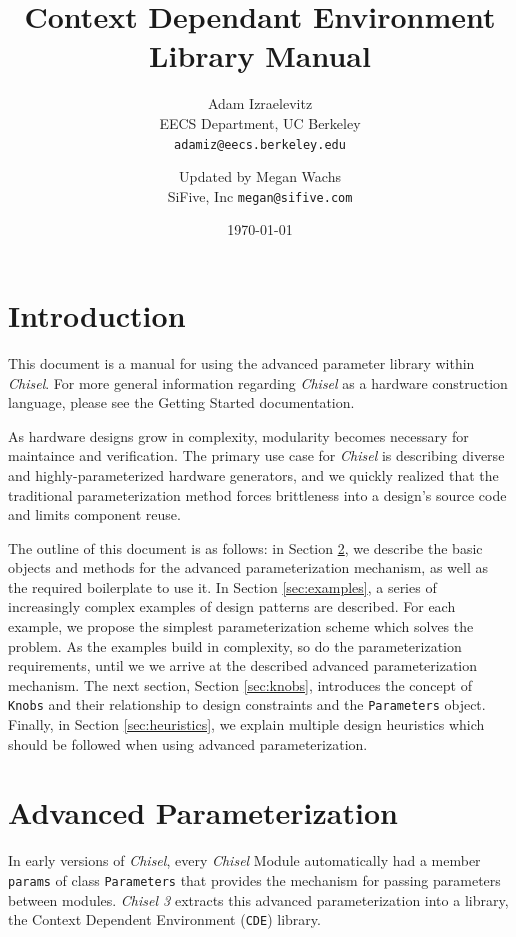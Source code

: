 \documentclass[10pt,twocolumn]{article}
\title{Context Dependant Environment Library Manual}
\author{Adam Izraelevitz \\
EECS Department, UC Berkeley\\
{\tt  adamiz@eecs.berkeley.edu}
}
\author{Updated by Megan Wachs \\
SiFive, Inc
{\tt  megan@sifive.com}
}
\date{\today}
\def\code#1{{\small\tt #1}}
\begin{document}
\maketitle{}


\section{Introduction}

This document is a manual for using the advanced parameter library within {\em Chisel}. For more general information regarding {\em Chisel} as a hardware construction language, please see the Getting Started documentation.

As hardware designs grow in complexity, modularity becomes necessary for maintaince and verification. The primary use case for {\em Chisel} is describing diverse and highly-parameterized hardware generators, and we quickly realized that the traditional parameterization method forces brittleness into a design's source code and limits component reuse.

The outline of this document is as follows: in Section \ref{sec:advanced}, we describe the basic objects and methods for the advanced parameterization mechanism, as well as the required boilerplate to use it. In Section \ref{sec:examples}, a series of increasingly complex examples of design patterns are described. For each example, we propose the simplest parameterization scheme which solves the problem. As the examples build in complexity, so do the parameterization requirements, until we we arrive at the described advanced parameterization mechanism. The next section, Section \ref{sec:knobs}, introduces the concept of \code{Knobs} and their relationship to design constraints and the \code{Parameters} object. Finally, in Section \ref{sec:heuristics}, we explain multiple design heuristics which should be followed when using advanced parameterization.

\section{Advanced Parameterization}
\label{sec:advanced}
	
In early versions of {\em Chisel}, every {\em Chisel} Module automatically
had a member \code{params} of class \code{Parameters} that provides the mechanism for passing
parameters between modules. {\em Chisel 3} extracts this advanced parameterization into a library,
the Context Dependent Environment (\code{CDE}) library.
\end{document}
